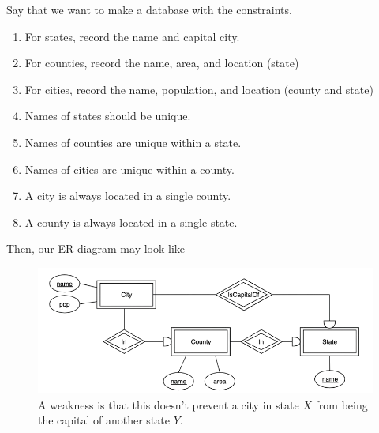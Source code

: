   \begin{example}
    Say that we want to make a database with the constraints. 
    \begin{enumerate}
      \item For states, record the name and capital city. 
      \item For counties, record the name, area, and location (state) 
      \item For cities, record the name, population, and location (county and state) 
      \item Names of states should be unique. 
      \item Names of counties are unique within a state. 
      \item Names of cities are unique within a county. 
      \item A city is always located in a single county. 
      \item A county is always located in a single state. 
    \end{enumerate}
    Then, our ER diagram may look like 
    \begin{figure}[H]
      \centering 
      \includegraphics[scale=0.3]{img/city1.png}
      \caption{A weakness is that this doesn't prevent a city in state $X$ from being the capital of another state $Y$.} 
      \label{fig:city1}
    \end{figure}
  \end{example}

